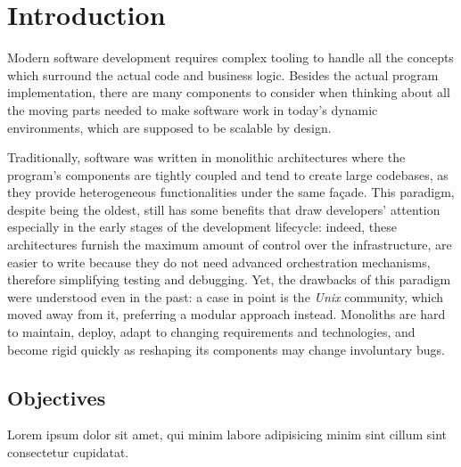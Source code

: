 \chapter{Introduction}
\label{chap:introduction}
Modern software development requires complex tooling to handle
all the concepts which surround the actual code and business logic.
Besides the actual program implementation, there are many components to consider
when thinking about all the moving parts needed to make software work
in today's dynamic environments, which are supposed to be scalable by design.

Traditionally, software was written in monolithic architectures where
the program's components are tightly coupled and tend to create
large codebases, as they provide heterogeneous functionalities under the same façade.
This paradigm, despite being the oldest, still has some benefits that
draw developers' attention especially in the early stages of the development lifecycle:
indeed, these architectures furnish the maximum amount of control over the infrastructure,
are easier to write because they do not need advanced orchestration mechanisms,
therefore simplifying testing and debugging.
Yet, the drawbacks of this paradigm were understood even in the past:
a case in point is the \textit{Unix} community, which moved away from it,
preferring a modular approach instead. Monoliths are hard to maintain, deploy,
adapt to changing requirements and technologies, and
become rigid quickly as reshaping its components may change involuntary bugs.


\section{Objectives} %

Lorem ipsum dolor sit amet, qui minim labore adipisicing minim sint cillum sint consectetur cupidatat.

